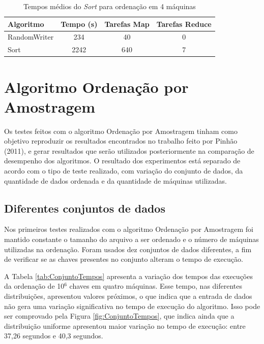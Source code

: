 \begin{table}[htbp]
\centering
\begin{footnotesize}
\begin{tabular}{|l|c|c|c|} \hline
Algoritmo 		&Tempo (s) 	&Tarefas Map 	&Tarefas Reduce\\ \hline \hline
RandomWriter 	&234				&40					&0						\\ \hline 
Sort					&2242				&640				&7						\\ \hline 
\end{tabular}
\end{footnotesize}
\caption{Tempos médios do \textit{Sort} para ordenação em 4 máquinas}
\label{tab:Sort}
\end{table}

\section{Algoritmo Ordenação por Amostragem}

Os testes feitos com o algoritmo Ordenação por Amostragem tinham como objetivo reproduzir os resultados encontrados no trabalho feito por Pinhão (2011), e gerar resultados 
que serão utilizados posteriormente na comparação de desempenho dos algoritmos. 
O resultado dos experimentos está separado de acordo com o tipo de teste realizado, com variação do conjunto de dados, da quantidade de dados ordenada e da quantidade de máquinas utilizadas. 


\subsection{Diferentes conjuntos de dados}
Nos primeiros testes realizados com o algoritmo Ordenação por Amostragem foi mantido constante o tamanho do arquivo a ser ordenado e o número de máquinas utilizadas na ordenação. Foram usados dez conjuntos de dados diferentes, a fim de verificar se as chaves presentes no conjunto alteram o tempo de execução. 


A Tabela \ref{tab:ConjuntoTempos} apresenta a variação dos tempos das execuções da ordenação de 10$^6$ chaves em quatro máquinas. 
Esse tempo, nas diferentes distribuições, apresentou valores próximos, o que indica que a entrada de dados não gera uma variação significativa no tempo de execução do algoritmo. Isso pode ser comprovado pela Figura \ref{fig:ConjuntoTempos}, que indica ainda que a distribuição uniforme apresentou maior variação no tempo de execução: entre 37,26 segundos e 40,3 segundos.

